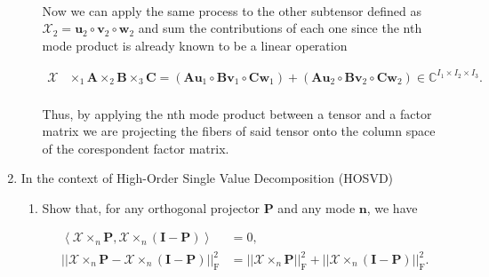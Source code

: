 \documentclass[a4paper,10pt]{article}
\begin{document}
\begin{enumerate}
\begin{enumerate}
                \paragraph{}Now we can apply the same process to the other subtensor defined as $\mathcal{X}_{2} = \boldsymbol{u}_{2} \circ \boldsymbol{v}_{2} \circ \boldsymbol{w}_{2}$ and sum the contributions of each one since the nth mode product is already known to be a linear operation
                
                \begin{align}
                    \mathcal{X} &\times_{1} \boldsymbol{A} \times_{2} \boldsymbol{B} \times_{3} \boldsymbol{C} = \left( \boldsymbol{A} \boldsymbol{u}_{1} \circ \boldsymbol{B} \boldsymbol{v}_{1} \circ \boldsymbol{C} \boldsymbol{w}_{1} \right) + \left( \boldsymbol{A} \boldsymbol{u}_{2} \circ \boldsymbol{B} \boldsymbol{v}_{2} \circ \boldsymbol{C} \boldsymbol{w}_{2} \right) \in \mathbb{C}^{I_{1} \times I_{2} \times I_{3}}.
                \end{align}
                
                \paragraph{}Thus, by applying the nth mode product between a tensor and a factor matrix we are projecting the fibers of said tensor onto the column space of the corespondent factor matrix.
        \end{enumerate}
    
    \item In the context of High-Order Single Value Decomposition (HOSVD)
    
        \begin{enumerate}
            
            \item Show that, for any orthogonal projector $\boldsymbol{P}$ and any mode $\boldsymbol{n}$, we have
            
                \begin{align}
                    \left< \mathcal{X} \times_{n} \boldsymbol{P}, \mathcal{X} \times_{n} (\boldsymbol{I} - \boldsymbol{P}) \right> &= 0, \label{eq:04} \\
                    || \mathcal{X} \times_{n} \boldsymbol{P} - \mathcal{X} \times_{n} (\boldsymbol{I} - \boldsymbol{P}) ||^{2}_{\text{F}} &= || \mathcal{X} \times_{n} \boldsymbol{P} ||^{2}_{\text{F}} + ||  \mathcal{X} \times_{n} (\boldsymbol{I} - \boldsymbol{P}) ||^{2}_{\text{F}} \label{eq:05}.
                \end{align}
                

\end{enumerate}
\end{enumerate}
\end{document}
